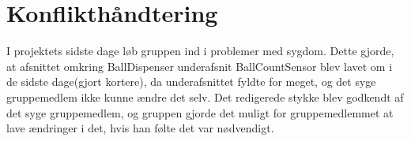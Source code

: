 \documentclass[a4paper,12pt,fleqn,oneside]{article}
\begin{document}
\section{Konflikthåndtering}
I projektets sidste dage løb gruppen ind i problemer med sygdom. Dette gjorde, at afsnittet omkring BallDispenser underafsnit BallCountSensor blev lavet om i de sidste dage(gjort kortere), da underafsnittet fyldte for meget, og det syge gruppemedlem ikke kunne ændre det selv. Det redigerede stykke blev godkendt af det syge gruppemedlem, og gruppen gjorde det muligt for gruppemedlemmet at lave ændringer i det, hvis han følte det var nødvendigt.
\newpage
\end{document}
